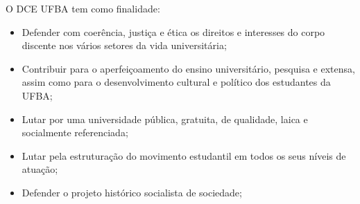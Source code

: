  O DCE UFBA tem como finalidade:
     \begin{itemize}
 \item Defender com coerência, justiça e ética os direitos e interesses do corpo discente nos vários setores da vida universitária;

 \item Contribuir para o aperfeiçoamento do ensino universitário, pesquisa e extensa, assim como para o desenvolvimento cultural e político dos estudantes da UFBA;

 \item Lutar por uma universidade pública, gratuita, de qualidade, laica e socialmente referenciada;

 \item Lutar pela estruturação do movimento estudantil em todos os seus níveis de atuação;

 \item Defender o projeto histórico socialista de sociedade;\\
    \end{itemize} 
